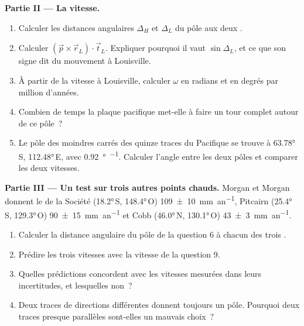 \begin{problem}
\medskip
\noindent\textbf{Partie II --- La vitesse.}
\begin{enumerate}[resume]
  \item Calculer les distances angulaires $\Delta_H$ et $\Delta_L$ du pôle
        aux deux .
  \item Calculer $(\vec p\times\vec r_L)\cdot\vec t_L$. Expliquer pourquoi il vaut
        $\sin\Delta_L$, et ce que son signe dit du mouvement à Louisville.
  \item À partir de la vitesse à Louisville, calculer $\omega$ en radians et en
        degrés par million d'années.
  \item Combien de temps la plaque pacifique met-elle à faire un tour complet autour de ce
        pôle~?
  \item Le pôle des moindres carrés des quinze traces du Pacifique se trouve à
        \ang{63.78}\,S, \ang{112.48}\,E, avec \qty{0.92}{\degree\per\Ma}.
        Calculer l'angle entre les deux pôles et comparer les deux vitesses.
\end{enumerate}

\medskip
\noindent\textbf{Partie III --- Un test sur trois autres points chauds.} Morgan et
Morgan donnent le  de la Société (\ang{18.2}\,S, \ang{148.4}\,O)
\qty[uncertainty-mode=separate]{109 \pm 10}{mm.an^{-1}}, Pitcairn
(\ang{25.4}\,S, \ang{129.3}\,O)
\qty[uncertainty-mode=separate]{90 \pm 15}{mm.an^{-1}} et Cobb
(\ang{46.0}\,N, \ang{130.1}\,O)
\qty[uncertainty-mode=separate]{43 \pm 3}{mm.an^{-1}}.
\begin{enumerate}[resume]
  \item Calculer la distance angulaire du pôle de la question 6 à chacun des
        trois .
  \item Prédire les trois vitesses avec la vitesse de la question 9.
  \item Quelles prédictions concordent avec les vitesses mesurées dans leurs
        incertitudes, et lesquelles non~?
  \item Deux traces de directions différentes donnent toujours un pôle. Pourquoi deux
        traces presque parallèles sont-elles un mauvais choix~?
\end{enumerate}


\end{problem}
